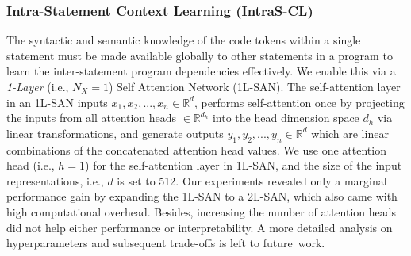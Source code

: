 



\vspace{2pt}
\subsubsection{{\bf Intra-Statement Context Learning (IntraS-CL)}}
\label{sec:ppda_arch_intra}
The syntactic and semantic knowledge of the code tokens within a
single statement must be made available globally to other statements
in a program to learn the inter-statement program dependencies
effectively. We enable this via a \textit{1-Layer} (i.e., $N_X$$=$$1$)
Self Attention Network (1L-SAN). The self-attention layer in an 1L-SAN
inputs $x_1, x_2, ..., x_n \in \mathbb{R}^d$, performs self-attention
once by projecting the inputs from all attention heads $\in
\mathbb{R}^{d_h}$ into the head dimension space $d_h$ via linear
transformations, and generate outputs $y_1, y_2, ..., y_n \in
\mathbb{R}^d$ which are linear combinations of the concatenated
attention head values. We use one attention head
(i.e., $h$$=$$1$) for the self-attention layer in 1L-SAN, and the size
of the input representations, i.e., $d$ is set to 512. Our experiments
revealed only a marginal performance gain by expanding the 1L-SAN to a
2L-SAN, which also came with high computational
overhead. Besides, increasing the number of attention heads did not
help either performance or interpretability. A more detailed analysis
on hyperparameters and subsequent
trade-offs is left to future~work.

